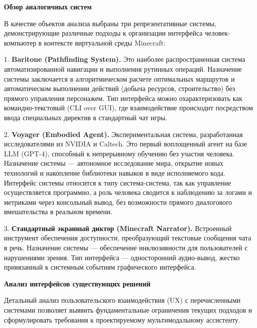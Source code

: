 \textbf{Обзор аналогичных систем}

В качестве объектов анализа выбраны три репрезентативные системы, демонстрирующие различные подходы к организации интерфейса человек-компьютер в контексте виртуальной среды Minecraft:

1. \textbf{Baritone (Pathfinding System).} Это наиболее распространенная система автоматизированной навигации и выполнения рутинных операций. Назначение системы заключается в алгоритмическом расчете оптимальных маршрутов и автоматическом выполнении действий (добыча ресурсов, строительство) без прямого управления персонажем. Тип интерфейса можно охарактеризовать как командно-текстовый (CLI over GUI), где взаимодействие происходит посредством ввода специальных директив в стандартный чат игры\cite{Baritone}.

2. \textbf{Voyager (Embodied Agent).} Экспериментальная система, разработанная исследователями из NVIDIA и Caltech. Это первый воплощенный агент на базе LLM (GPT-4), способный к непрерывному обучению без участия человека. Назначение системы — автономное исследование мира, открытие новых технологий и накопление библиотеки навыков в виде исполняемого кода. Интерфейс системы относится к типу система-система, так как управление осуществляется программно, а роль человека сводится к наблюдению за логами и метриками через консольный вывод, без возможности прямого диалогового вмешательства в реальном времени\cite{Wang2023}.

3. \textbf{Стандартный экранный диктор (Minecraft Narrator).} Встроенный инструмент обеспечения доступности, преобразующий текстовые сообщения чата в речь. Назначение системы — обеспечение инклюзивности для пользователей с нарушениями зрения. Тип интерфейса — односторонний аудио-вывод, жестко привязанный к системным событиям графического интерфейса\cite{MinecraftAccessibility}.

\textbf{Анализ интерфейсов существующих решений}

Детальный анализ пользовательского взаимодействия (UX) с перечисленными системами позволяет выявить фундаментальные ограничения текущих подходов и сформулировать требования к проектируемому мультимодальному ассистенту.

